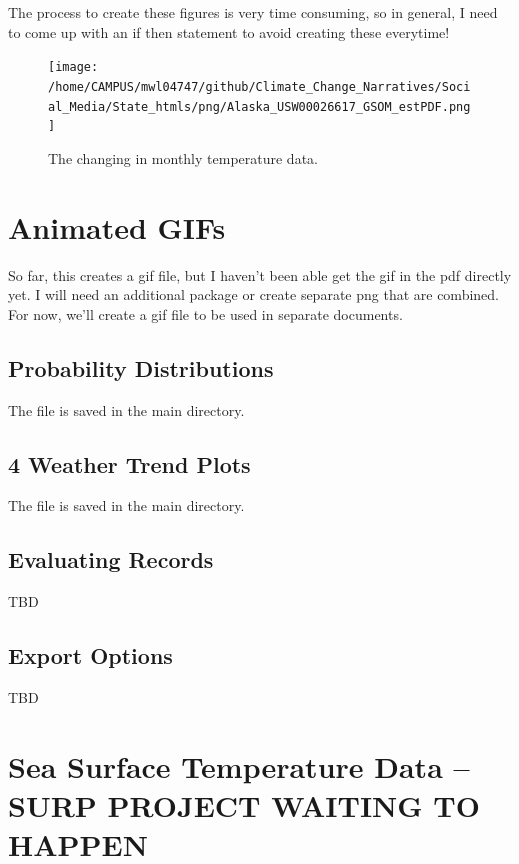 \documentclass{article}\usepackage[]{graphicx}\usepackage[]{color}
\begin{document}
The process to create these figures is very time consuming, so in general, I need to come up with an if then statement to avoid creating these everytime!

\begin{figure}
\texttt{[image: /home/CAMPUS/mwl04747/github/Climate\_Change\_Narratives/Social\_Media/State\_htmls/png/Alaska\_USW00026617\_GSOM\_estPDF.png]}
\caption{The changing in monthly temperature data.}
\label{fig:GSOM_estPDF}
\end{figure}

\section{Animated GIFs}

So far, this creates a gif file, but I haven't been able get the gif in the pdf directly yet. I will need an additional package or create separate png that are combined. For now, we'll create a gif file to be used in separate documents.

\subsection{Probability Distributions}




The file is saved in the main directory. 


\subsection{4 Weather Trend Plots}




The file is saved in the main directory. 


\subsection{Evaluating Records}

TBD

\subsection{Export Options}

TBD

\section{Sea Surface Temperature Data -- SURP PROJECT WAITING TO HAPPEN}
\end{document}
